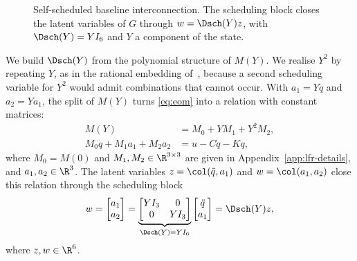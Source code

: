 \begin{figure}[t]
  \centering
  
  \caption{Self-scheduled baseline interconnection. The scheduling block
  closes the latent variables of $G$ through $w=\Dsch(Y)z$, with
  $\Dsch(Y)=YI_6$ and $Y$ a component of the state.}
  \label{fig:lfr}
\end{figure}

We build $\Dsch(Y)$ from the polynomial structure of $M(Y)$.
We realise $Y^2$ by repeating $Y$, as in the rational embedding
of~\cite[Sec.~2.1.1]{drenth2025thesis}, because a second scheduling variable
for $Y^2$ would admit combinations that cannot occur.
With $a_1=Y\ddot q$ and $a_2=Ya_1$, the split of $M(Y)$ turns \eqref{eq:eom}
into a relation with constant matrices:
\begin{equation}
\begin{aligned}
  M(Y)&=M_0+YM_1+Y^2M_2,\\
  M_0\ddot q+M_1a_1+M_2a_2&=u-C\dot q-Kq,
\end{aligned}
  \label{eq:Msplit}
\end{equation}
where $M_0=M(0)$ and $M_1,M_2\in\R^{3\times3}$ are given in
Appendix~\ref{app:lfr-details}, and $a_1,a_2\in\R^3$.
The latent variables $z=\col(\ddot q,a_1)$ and $w=\col(a_1,a_2)$ close this
relation through the scheduling block
\begin{equation}
  w=\begin{bmatrix}a_1\\a_2\end{bmatrix}
   =\underbrace{\begin{bmatrix}YI_3&0\\0&YI_3\end{bmatrix}}_{\Dsch(Y)=YI_6}
    \begin{bmatrix}\ddot q\\a_1\end{bmatrix}
   =\Dsch(Y)z,
  \label{eq:delta}
\end{equation}
where $z,w\in\R^6$.

